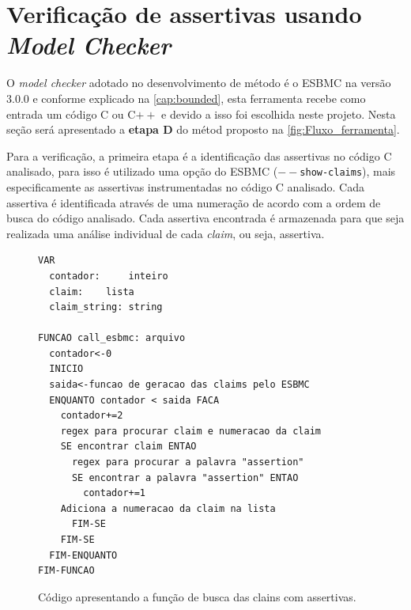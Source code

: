 \section{Verificação de assertivas usando \textit{Model Checker}}

\par
O \textit{model checker} adotado no desenvolvimento de método é o ESBMC na versão $3.0.0$ e conforme explicado na \autoref{cap:bounded}, esta ferramenta recebe como entrada um código C ou C$++$ e devido a isso foi escolhida neste projeto. Nesta seção será apresentado a \textbf{etapa D} do métod proposto na \autoref{fig:Fluxo_ferramenta}.

\par
Para a verificação, a primeira etapa é a identificação das assertivas no código C analisado, para isso é utilizado uma opção do ESBMC (\texttt{$--$show-claims}), 
mais especificamente as assertivas instrumentadas no código C analisado. Cada assertiva é identificada através de uma numeração de acordo com a ordem de busca do código analisado. Cada assertiva encontrada é armazenada para que seja realizada uma análise individual de cada \textit{claim}, ou seja,  assertiva.

\begin{figure}[H]
\caption{\label{fig:codigo_claims} Código apresentando a função de busca das clains com assertivas.}
	\begin{center}
    \begin{minipage}{0.99\textwidth}
    \begin{lstlisting}       
VAR
  contador: 	inteiro
  claim: 	lista
  claim_string: string 

FUNCAO call_esbmc: arquivo
  contador<-0
  INICIO
  saida<-funcao de geracao das claims pelo ESBMC
  ENQUANTO contador < saida FACA
    contador+=2
    regex para procurar claim e numeracao da claim
    SE encontrar claim ENTAO
      regex para procurar a palavra "assertion"
      SE encontrar a palavra "assertion" ENTAO
        contador+=1
	Adiciona a numeracao da claim na lista
      FIM-SE
    FIM-SE
  FIM-ENQUANTO
FIM-FUNCAO
    \end{lstlisting}
    \end{minipage}
	\end{center}
\end{figure}

